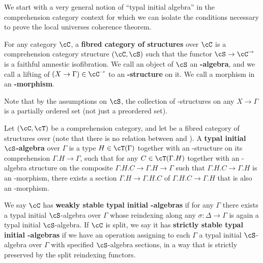 \documentclass{amsart}
\let\S\cS
\let\C\cC
\let\T\cT
\begin{document}
We start with a very general notion of ``typal initial algebra'' in the comprehension category context for which we can isolate the conditions necessary to prove the local universes coherence theorem.

\begin{defn}
  For any category $\C$, a \textbf{fibred category of structures} over $\C$ is a comprehension category structure $(\C,\S)$ such that the functor $\S\to\C^\to$ is a faithful amnestic isofibration.
  We call an object of $\S$ an \textbf{\S-algebra}, and we call a lifting of $(X\to \Gamma)\in\C^\to$ to \S an \textbf{\S-structure} on it.
  We call a morphism in \S an \textbf{\S-morphism}.
\end{defn}

Note that by the assumptions on $\S$, the collection of \S-structures on any $X\to \Gamma$ is a partially ordered set (not just a preordered set).

\begin{defn}
  Let $(\C,\T)$ be a comprehension category, and let \S be a fibred category of structures over \C (note that there is no relation between \S and \T).
  A \textbf{typal initial $\S$-algebra} over $\Gamma$ is a type $H\in \T(\Gamma)$ together with an \S-structure on its comprehension $\Gamma.H\to\Gamma$, such that for any $C\in\T(\Gamma.H)$ together with an \S-algebra structure on the composite $\Gamma.H.C\to\Gamma.H\to\Gamma$ such that $\Gamma.H.C\to\Gamma.H$ is an \S-morphism, there exists a section $\Gamma.H \to \Gamma.H.C$ of $\Gamma.H.C\to\Gamma.H$ that is also an \S-morphism.

  We say $\C$ has \textbf{weakly stable typal initial \S-algebras} if for any $\Gamma$ there exists a typal initial $\S$-algebra over $\Gamma$ whose reindexing along any $\sigma:\Delta\to\Gamma$ is again a typal initial $\S$-algebra.
  If $\C$ is split, we say it has \textbf{strictly stable typal initial \S-algebras} if we have an operation assigning to each $\Gamma$ a typal initial $\S$-algebra over $\Gamma$ with specified $\S$-algebra sections, in a way that is strictly preserved by the split reindexing functors.
\end{defn}
\end{document}
